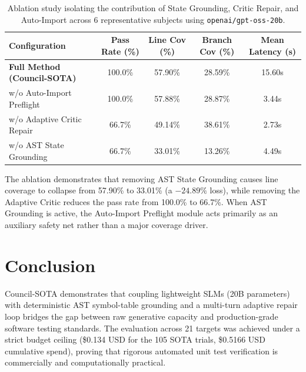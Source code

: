 \documentclass[conference]{IEEEtran}
\begin{document}
\begin{table}[t]
\centering
\small
\caption{Ablation study isolating the contribution of State Grounding, Critic Repair, and Auto-Import across 6 representative subjects using \texttt{openai/gpt-oss-20b}.}
\label{tab:ablation_study}
\begin{tabular}{l c c c c}
\toprule
\textbf{Configuration} & \textbf{Pass Rate (\%)} & \textbf{Line Cov (\%)} & \textbf{Branch Cov (\%)} & \textbf{Mean Latency (s)} \\
\midrule
\textbf{Full Method (Council-SOTA)} & 100.0\% & 57.90\% & 28.59\% & 15.60s \\
w/o Auto-Import Preflight & 100.0\% & 57.88\% & 28.87\% & 3.44s \\
w/o Adaptive Critic Repair & 66.7\% & 49.14\% & 38.61\% & 2.73s \\
w/o AST State Grounding & 66.7\% & 33.01\% & 13.26\% & 4.49s \\
\bottomrule
\end{tabular}
\end{table}

The ablation demonstrates that removing AST State Grounding causes line coverage to collapse from 57.90\% to 33.01\% (a $-24.89\%$ loss), while removing the Adaptive Critic reduces the pass rate from 100.0\% to 66.7\%. When AST Grounding is active, the Auto-Import Preflight module acts primarily as an auxiliary safety net rather than a major coverage driver.

\section{Conclusion}
Council-SOTA demonstrates that coupling lightweight SLMs (20B parameters) with deterministic AST symbol-table grounding and a multi-turn adaptive repair loop bridges the gap between raw generative capacity and production-grade software testing standards. The evaluation across 21 targets was achieved under a strict budget ceiling (\$0.134 USD for the 105 SOTA trials, \$0.5166 USD cumulative spend), proving that rigorous automated unit test verification is commercially and computationally practical.
\end{document}
